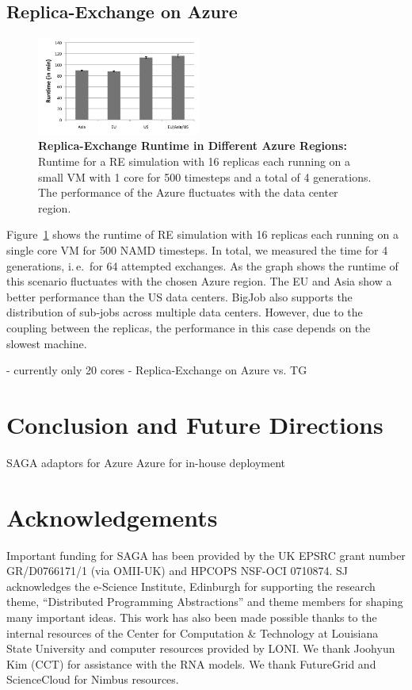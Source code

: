 \documentclass[conference,final]{IEEEtran}
\newcommand{\up}{\vspace*{-1em}}
\def\acknowledgementname{Acknowledgements}
\newenvironment{acknowledgement}%
{\section*{\acknowledgementname}%
\parindent=0pt%
}
\newcommand{\alnote}[1]{ {\textcolor{blue} { ***AL: #1 }}}
\newcommand{\alnote}[1]{}
\begin{document}
\subsection{Replica-Exchange on Azure}

\begin{figure}[htbp]
    \centering
        \includegraphics[width=0.48\textwidth]{performance/repex_runtime_per_region.pdf}
    \caption{\textbf{Replica-Exchange Runtime in Different Azure Regions:} Runtime for a RE simulation with 
    16 replicas each running on a small VM with 1 core for 500 timesteps and a total of 4 generations. The performance of
    the Azure fluctuates with the data center region. }
    \label{fig:performance_repex_runtime_per_region}
\end{figure}

Figure~\ref{fig:performance_repex_runtime_per_region} shows the runtime of RE simulation
with 16 replicas each running on a single core VM for 500 NAMD timesteps. In total, we measured
the time for 4 generations, i.\,e.\ for 64 attempted exchanges. As the graph shows the runtime
of this scenario fluctuates with the chosen Azure region. The EU and Asia show a better performance
than the US data centers. BigJob also supports the distribution of sub-jobs across multiple data 
centers. However, due to the coupling between the replicas, the performance in this case
depends on the slowest machine.


- currently only 20 cores 
- Replica-Exchange on Azure vs. TG


\alnote{qualitative comparison: easy coordination with queue service}
\alnote{distribution how easy in comparison to TG?}
\alnote{startup time based on different data center?}
\section{Conclusion and Future Directions}


SAGA adaptors for Azure
Azure for in-house deployment



\begin{acknowledgement} 
  \up \footnotesize{Important funding for SAGA has been provided by
    the UK EPSRC grant number GR/D0766171/1 (via OMII-UK) and HPCOPS
    NSF-OCI 0710874. SJ acknowledges the e-Science Institute,
    Edinburgh for supporting the research theme, ``Distributed
    Programming Abstractions'' and theme members for shaping many
    important ideas. This work has also been made possible thanks to
    the internal resources of the Center for Computation \& Technology
    at Louisiana State University and computer resources provided by
    LONI. We thank Joohyun Kim (CCT) for
    assistance with the RNA models. We thank FutureGrid and
    ScienceCloud for Nimbus resources.}
\end{acknowledgement}

\up


\end{document}
